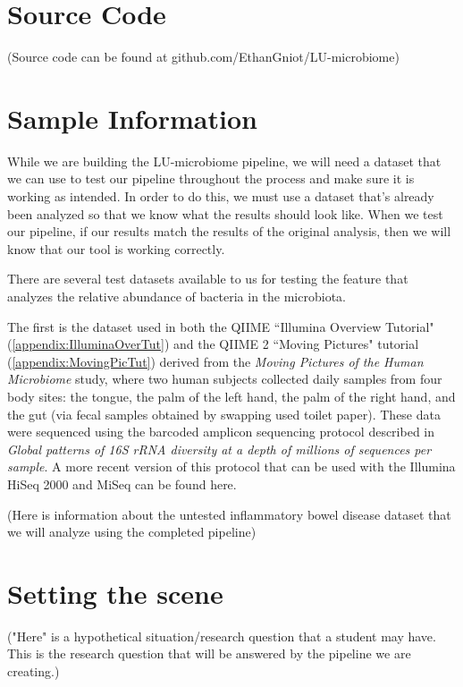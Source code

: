 \chapter{Source Code}
(Source code can be found at github.com/EthanGniot/LU-microbiome)

\chapter{Sample Information}

While we are building the LU-microbiome pipeline, we will need a dataset that we can use to test our pipeline throughout the process and make sure it is working as intended. In order to do this, we must use a dataset that's already been analyzed so that we know what the results should look like. When we test our pipeline, if our results match the results of the original analysis, then we will know that our tool is working correctly.

There are several test datasets available to us for testing the feature that analyzes the relative abundance of bacteria in the microbiota.

The first is the dataset used in both the QIIME ``Illumina Overview Tutorial" (\ref{appendix:IlluminaOverTut})  and the QIIME 2 ``Moving Pictures" tutorial (\ref{appendix:MovingPicTut}) derived from the  \textit{Moving Pictures of the Human Microbiome} study, where two human subjects collected daily samples from four body sites: the tongue, the palm of the left hand, the palm of the right hand, and the gut (via fecal samples obtained by swapping used toilet paper). These data were sequenced using the barcoded amplicon sequencing protocol described in  \textit{Global patterns of 16S rRNA diversity at a depth of millions of sequences per sample}. A more recent version of this protocol that can be used with the Illumina HiSeq 2000 and MiSeq can be found here. 

(Here is information about the untested inflammatory bowel disease dataset that we will analyze using the completed pipeline)

\chapter{Setting the scene}
("Here" is a hypothetical situation/research question that a student may have. This is the research question that will be answered by the pipeline we are creating.)

